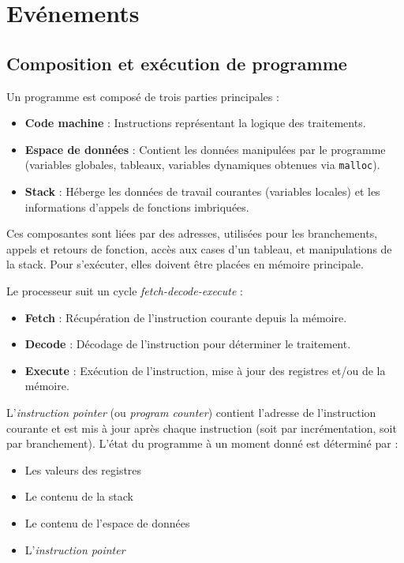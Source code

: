 \section{Evénements}\label{sec:evenements}
\subsection{Composition et exécution de programme}

Un programme est composé de trois parties principales :
\begin{itemize}
    \item \textbf{Code machine} : Instructions représentant la logique des traitements.
    \item \textbf{Espace de données} : Contient les données manipulées par le programme (variables globales, tableaux, variables dynamiques obtenues via \texttt{malloc}).
    \item \textbf{Stack} : Héberge les données de travail courantes (variables locales) et les informations d'appels de fonctions imbriquées.
\end{itemize}

Ces composantes sont liées par des adresses, utilisées pour les branchements, appels et retours de fonction, accès aux cases d'un tableau, et manipulations de la stack. Pour s'exécuter, elles doivent être placées en mémoire principale.

Le processeur suit un cycle \textit{fetch-decode-execute} :
\begin{itemize}
    \item \textbf{Fetch} : Récupération de l'instruction courante depuis la mémoire.
    \item \textbf{Decode} : Décodage de l'instruction pour déterminer le traitement.
    \item \textbf{Execute} : Exécution de l'instruction, mise à jour des registres et/ou de la mémoire.
\end{itemize}

L'\textit{instruction pointer} (ou \textit{program counter}) contient l'adresse de l'instruction courante et est mis à jour après chaque instruction (soit par incrémentation, soit par branchement). L'état du programme à un moment donné est déterminé par :
\begin{itemize}
    \item Les valeurs des registres
    \item Le contenu de la stack
    \item Le contenu de l'espace de données
    \item L'\textit{instruction pointer}
\end{itemize}

